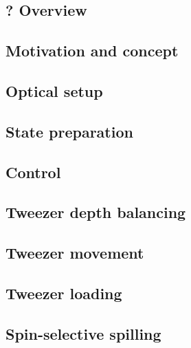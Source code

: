 \documentclass[twoside]{article}
\begin{document}
\subsection{? Overview} \label{subsec:state-prepation-overview}


\subsection{Motivation and concept} \label{subsec:aodconcept}

\subsection{Optical setup}

\subsection{State preparation} \label{subsec:state-prepation}

\subsection{Control} \label{subsec:control}


\subsection{Tweezer depth balancing} \label{subsec:balancing}


\subsection{Tweezer movement} \label{subsec:tweezer-movement}


\subsection{Tweezer loading} \label{subsec:tweezer-loading}


\subsection{Spin-selective spilling} \label{subsec:spin-selective-spilling}

\end{document}
